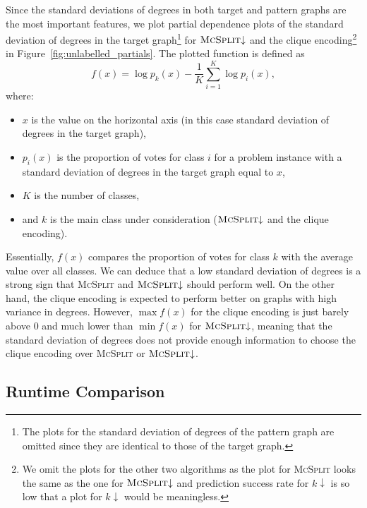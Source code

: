 \documentclass{l4proj}
\theoremstyle{definition}
\theoremstyle{remark}
\begin{document}
Since the standard deviations of degrees in both target and pattern graphs are
the most important features, we plot partial dependence plots of the standard
deviation of degrees in the target graph\footnote{The plots for the standard
  deviation of degrees of the pattern graph are omitted since they are identical
  to those of the target graph.} for $\textsc{McSplit}{\downarrow}$ and the
clique encoding\footnote{We omit the plots for the other two algorithms as the
  plot for \textsc{McSplit} looks the same as the one for
  $\textsc{McSplit}{\downarrow}$ and prediction success rate for $k{\downarrow}$
  is so low that a plot for $k{\downarrow}$ would be meaningless.} in
Figure~\ref{fig:unlabelled_partials}. The plotted function \cite{forest} is
defined as
\[ f(x) = \log{p_k(x)} - \frac{1}{K} \sum_{i=1}^K \log{p_i(x)}, \]
where:

\begin{itemize}
\item $x$ is the value on the horizontal axis (in this case standard deviation of
  degrees in the target graph),
\item $p_i(x)$ is the proportion of votes for class $i$ for a problem instance
  with a standard deviation of degrees in the target graph equal to $x$,
\item $K$ is the number of classes,
\item and $k$ is the main class under consideration
  ($\textsc{McSplit}{\downarrow}$ and the clique encoding).
\end{itemize}

Essentially, $f(x)$ compares the proportion of votes for class $k$ with the
average value over all classes. We can deduce that a low standard deviation of
degrees is a strong sign that \textsc{McSplit} and $\textsc{McSplit}{\downarrow}$
should perform well. On the other hand, the clique encoding is expected to
perform better on graphs with high variance in degrees. However, $\max f(x)$ for
the clique encoding is just barely above 0 and much lower than $\min f(x)$ for
$\textsc{McSplit}{\downarrow}$, meaning that the standard deviation of degrees
does not provide enough information to choose the clique encoding over
\textsc{McSplit} or $\textsc{McSplit}{\downarrow}$.

\subsection{Runtime Comparison}
\end{document}
